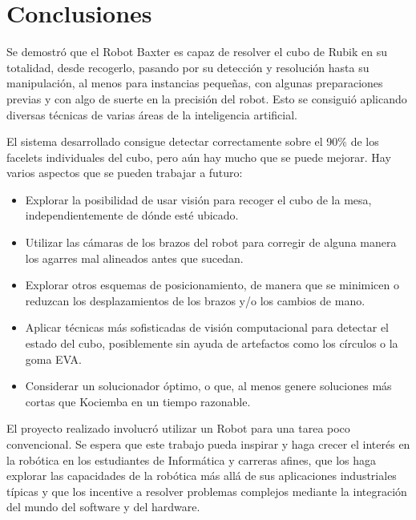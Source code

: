 \chapter{Conclusiones}

Se demostró que el Robot Baxter es capaz de resolver el cubo de Rubik en su totalidad, desde recogerlo, pasando por su detección y resolución hasta su manipulación, al menos para instancias pequeñas, con algunas preparaciones previas y con algo de suerte en la precisión del robot. Esto se consiguió aplicando diversas técnicas de varias áreas de la inteligencia artificial.

El sistema desarrollado consigue detectar correctamente sobre el 90\% de los facelets individuales del cubo, pero aún hay mucho que se puede mejorar. Hay varios aspectos que se pueden trabajar a futuro:
\begin{itemize}
	\item Explorar la posibilidad de usar visión para recoger el cubo de la mesa, independientemente de dónde esté ubicado.
	\item Utilizar las cámaras de los brazos del robot para corregir de alguna manera los agarres mal alineados antes que sucedan.
	\item Explorar otros esquemas de posicionamiento, de manera que se minimicen o reduzcan los desplazamientos de los brazos y/o los cambios de mano.
	\item Aplicar técnicas más sofisticadas de visión computacional para detectar el estado del cubo, posiblemente sin ayuda de artefactos como los círculos o la goma EVA.
	\item Considerar un solucionador óptimo, o que, al menos genere soluciones más cortas que Kociemba en un tiempo razonable.
\end{itemize}


El proyecto realizado involucró utilizar un Robot para una tarea poco convencional. Se espera que este trabajo pueda inspirar y haga crecer el interés en la robótica en los estudiantes de Informática y carreras afines, que los haga explorar las capacidades de la robótica más allá de sus aplicaciones industriales típicas y que los incentive a resolver problemas complejos mediante la integración del mundo del software y del hardware.
